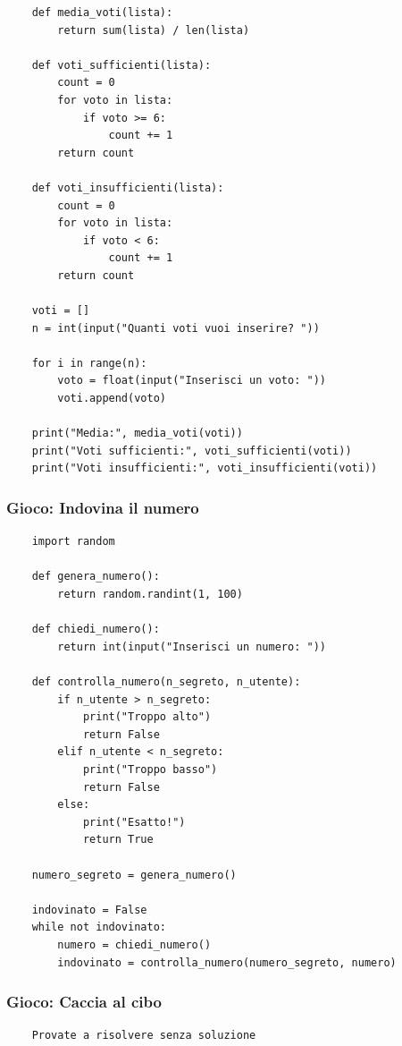 \documentclass[a4paper,12pt]{article}
\begin{document}
\begin{lstlisting}
	def media_voti(lista):
		return sum(lista) / len(lista)
	
	def voti_sufficienti(lista):
		count = 0
		for voto in lista:
			if voto >= 6:
				count += 1
		return count
	
	def voti_insufficienti(lista):
		count = 0
		for voto in lista:
			if voto < 6:
				count += 1
		return count
	
	voti = []
	n = int(input("Quanti voti vuoi inserire? "))
	
	for i in range(n):
		voto = float(input("Inserisci un voto: "))
		voti.append(voto)
	
	print("Media:", media_voti(voti))
	print("Voti sufficienti:", voti_sufficienti(voti))
	print("Voti insufficienti:", voti_insufficienti(voti))
\end{lstlisting}

\newpage
\subsubsection{Gioco: Indovina il numero}

\begin{lstlisting}
	import random
	
	def genera_numero():
		return random.randint(1, 100)
	
	def chiedi_numero():
		return int(input("Inserisci un numero: "))
	
	def controlla_numero(n_segreto, n_utente):
		if n_utente > n_segreto:
			print("Troppo alto")
			return False
		elif n_utente < n_segreto:
			print("Troppo basso")
			return False
		else:
			print("Esatto!")
			return True
	
	numero_segreto = genera_numero()
	
	indovinato = False
	while not indovinato:
		numero = chiedi_numero()
		indovinato = controlla_numero(numero_segreto, numero)
\end{lstlisting}

\newpage
\subsubsection{Gioco: Caccia al cibo}

\begin{lstlisting}
	Provate a risolvere senza soluzione
\end{lstlisting}




	
\end{document}
